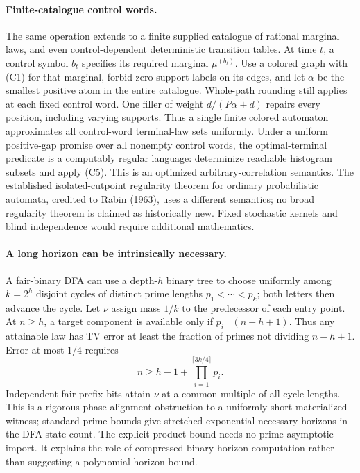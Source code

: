 \documentclass[11pt]{article}
\begin{document}
\paragraph{Finite-catalogue control words.}
The same operation extends to a finite supplied catalogue of rational marginal laws, and even control-dependent deterministic transition tables. At time $t$, a control symbol $b_t$ specifies its required marginal $\mu^{(b_t)}$. Use a colored graph with (C1) for that marginal, forbid zero-support labels on its edges, and let $\alpha$ be the smallest positive atom in the entire catalogue. Whole-path rounding still applies at each fixed control word. One filler of weight $d/(P\alpha+d)$ repairs every position, including varying supports. Thus a single finite colored automaton approximates all control-word terminal-law sets uniformly. Under a uniform positive-gap promise over all nonempty control words, the optimal-terminal predicate is a computably regular language: determinize reachable histogram subsets and apply (C5). This is an optimized arbitrary-correlation semantics. The established isolated-cutpoint regularity theorem for ordinary probabilistic automata, credited to \href{https://doi.org/10.1016/S0019-9958(63)90290-0}{Rabin (1963)}, uses a different semantics; no broad regularity theorem is claimed as historically new. Fixed stochastic kernels and blind independence would require additional mathematics.

\paragraph{A long horizon can be intrinsically necessary.}
A fair-binary DFA can use a depth-$h$ binary tree to choose uniformly among $k=2^h$ disjoint cycles of distinct prime lengths $p_1<\cdots<p_k$; both letters then advance the cycle. Let $\nu$ assign mass $1/k$ to the predecessor of each entry point. At $n\ge h$, a target component is available only if $p_i\mid(n-h+1)$. Thus any attainable law has TV error at least the fraction of primes not dividing $n-h+1$. Error at most $1/4$ requires
\[
n\ge h-1+\prod_{i=1}^{\lceil3k/4\rceil}p_i.
\]
Independent fair prefix bits attain $\nu$ at a common multiple of all cycle lengths. This is a rigorous phase-alignment obstruction to a uniformly short materialized witness; standard prime bounds give stretched-exponential necessary horizons in the DFA state count. The explicit product bound needs no prime-asymptotic import. It explains the role of compressed binary-horizon computation rather than suggesting a polynomial horizon bound.
\end{document}
